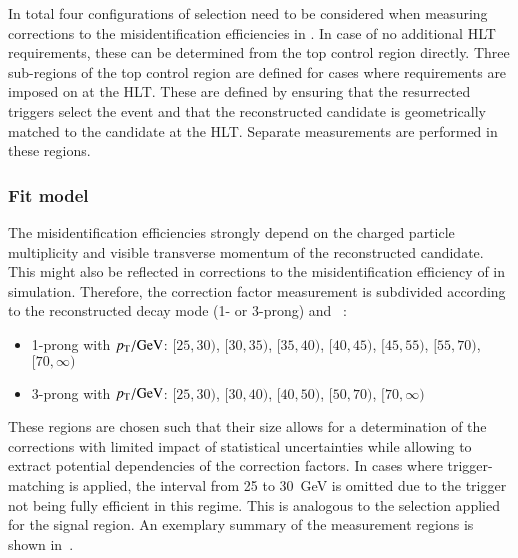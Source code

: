 In total four configurations of \tauhadvis selection need to be
considered when measuring corrections to the \tauhadvis
misidentification efficiencies in \ttbar. In case of no additional HLT
requirements, these can be determined from the top control region
directly. Three sub-regions of the top control region are defined for
cases where requirements are imposed on \tauhadvis at the HLT. These
are defined by ensuring that the resurrected triggers select the event
and that the reconstructed \tauhadvis candidate is geometrically
matched to the \tauhadvis candidate at the HLT. Separate measurements
are performed in these regions.



\subsubsection{Fit model}

The \tauhadvis misidentification efficiencies strongly depend on the
charged particle multiplicity and visible transverse momentum of the
reconstructed \tauhadvis candidate. This might also be reflected in
corrections to the misidentification efficiency of \tauhadvis in
simulation. Therefore, the correction factor measurement is subdivided
according to the reconstructed decay mode (1- or 3-prong) and
\tauhadvis~\pT:
\begin{itemize}

\item 1-prong \tauhadvis with $\pT / \si{\GeV}$: $[25, 30)$, $[30, 35)$,
  $[35, 40)$, $[40, 45)$, $[45, 55)$, $[55, 70)$, $[70, \infty)$

\item 3-prong \tauhadvis with $\pT / \si{\GeV}$: $[25, 30)$, $[30, 40)$,
  $[40, 50)$, $[50, 70)$, $[70, \infty)$

\end{itemize}
These regions are chosen such that their size allows for a
determination of the corrections with limited impact of statistical
uncertainties while allowing to extract potential \pT dependencies of
the correction factors. In cases where trigger-matching is applied,
the \tauhadvis \pT interval from 25 to \SI{30}{\GeV} is omitted due to
the trigger not being fully efficient in this regime. This is
analogous to the selection applied for the \hadhad signal region. An
exemplary summary of the measurement regions is shown
in~.

